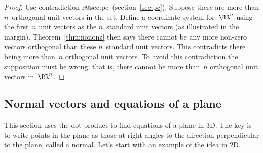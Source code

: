 \begin{proof} 
Use contradiction%
\ifcsname r@sec:pc\endcsname\ (section~\ref{sec:pc})\fi.
Suppose there are more than \(n\)~orthogonal unit vectors in the set.
Define a coordinate system for~\(\RR^n\) using the first~\(n\) unit vectors as the \(n\)~standard unit vectors 
%
(as illustrated in the margin).
Theorem~\ref{thm:nononz} then says there cannot be any more non-zero vectors orthogonal than these \(n\)~standard unit vectors.
This contradicts there being more than~\(n\) orthogonal unit vectors.
To avoid this contradiction the supposition must be wrong; that is, there cannot be more than~\(n\) orthogonal unit vectors in~\(\RR^n\).
\end{proof}








\subsection{Normal vectors and equations of a plane}
\label{sec:nvep}

This section uses the dot product to find equations of a plane in 3D.
The key is to write points in the plane as those at right-angles to the direction perpendicular to the plane, called a normal.
Let's start with an example of the idea in 2D.

